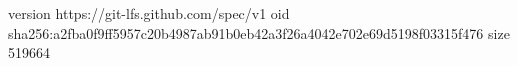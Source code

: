 version https://git-lfs.github.com/spec/v1
oid sha256:a2fba0f9ff5957c20b4987ab91b0eb42a3f26a4042e702e69d5198f03315f476
size 519664
